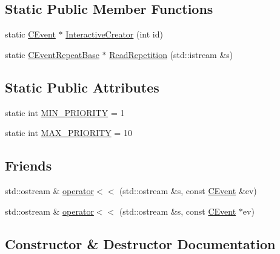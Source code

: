 \subsection*{Static Public Member Functions}
\begin{DoxyCompactItemize}
\item 
static \mbox{\hyperlink{class_c_event}{C\+Event}} $\ast$ \mbox{\hyperlink{class_c_event_a2be888eac9b425f56bdb1dba6b5593db}{Interactive\+Creator}} (int id)
\item 
static \mbox{\hyperlink{class_c_event_repeat_base}{C\+Event\+Repeat\+Base}} $\ast$ \mbox{\hyperlink{class_c_event_a5483d63b96f5c7804202159f5c0fea06}{Read\+Repetition}} (std\+::istream \&s)
\end{DoxyCompactItemize}
\subsection*{Static Public Attributes}
\begin{DoxyCompactItemize}
\item 
static int \mbox{\hyperlink{class_c_event_ad20159365449be421368c23b0b6377e5}{M\+I\+N\+\_\+\+P\+R\+I\+O\+R\+I\+TY}} = 1
\item 
static int \mbox{\hyperlink{class_c_event_acba68da6e8b7dc00527313dc6e253c15}{M\+A\+X\+\_\+\+P\+R\+I\+O\+R\+I\+TY}} = 10
\end{DoxyCompactItemize}
\subsection*{Friends}
\begin{DoxyCompactItemize}
\item 
std\+::ostream \& \mbox{\hyperlink{class_c_event_a660eccf6bdf9ccc6764389844758d339}{operator$<$$<$}} (std\+::ostream \&s, const \mbox{\hyperlink{class_c_event}{C\+Event}} \&ev)
\item 
std\+::ostream \& \mbox{\hyperlink{class_c_event_a5d65822e265f6f6537e4acab12bb9119}{operator$<$$<$}} (std\+::ostream \&s, const \mbox{\hyperlink{class_c_event}{C\+Event}} $\ast$ev)
\end{DoxyCompactItemize}


\subsection{Constructor \& Destructor Documentation}
\mbox{\label{class_c_event_ad374d2c0160476ae18df3cf3673618f8}} 
